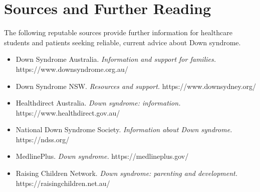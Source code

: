 \section*{Sources and Further Reading}
The following reputable sources provide further information for healthcare students and patients seeking reliable, current advice about Down syndrome.

\begin{itemize}
    \item Down Syndrome Australia. \textit{Information and support for families.} https://www.downsyndrome.org.au/
    \item Down Syndrome NSW. \textit{Resources and support.} https://www.downsydney.org/
    \item Healthdirect Australia. \textit{Down syndrome: information.} https://www.healthdirect.gov.au/
    \item National Down Syndrome Society. \textit{Information about Down syndrome.} https://ndss.org/
    \item MedlinePlus. \textit{Down syndrome.} https://medlineplus.gov/
    \item Raising Children Network. \textit{Down syndrome: parenting and development.} https://raisingchildren.net.au/
\end{itemize}
